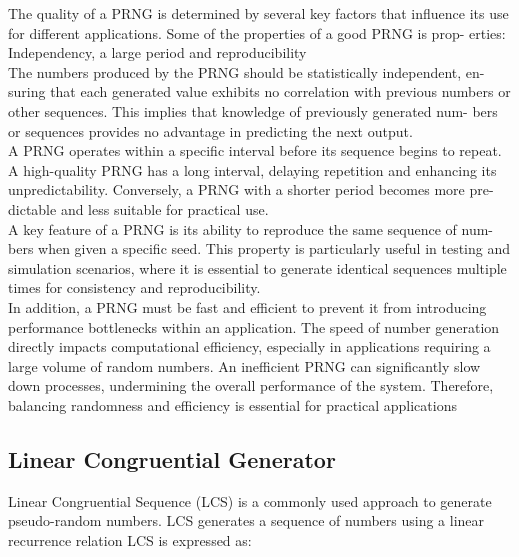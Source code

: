 The quality of a PRNG is determined by several key factors that influence its
use for different applications. Some of the properties of a good PRNG is prop-
erties: Independency, a large period and reproducibility
\newline \\
The numbers produced by the PRNG should be statistically independent, en-
suring that each generated value exhibits no correlation with previous numbers
or other sequences. This implies that knowledge of previously generated num-
bers or sequences provides no advantage in predicting the next output.
\newline \\
A PRNG operates within a specific interval before its sequence begins to repeat.
A high-quality PRNG has a long interval, delaying repetition and enhancing its
unpredictability. Conversely, a PRNG with a shorter period becomes more pre-
dictable and less suitable for practical use.
\newline \\
A key feature of a PRNG is its ability to reproduce the same sequence of num-
bers when given a specific seed. This property is particularly useful in testing
and simulation scenarios, where it is essential to generate identical sequences
multiple times for consistency and reproducibility.
\newline \\
In addition, a PRNG must be fast and efficient to prevent it from introducing
performance bottlenecks within an application. The speed of number generation
directly impacts computational efficiency, especially in applications requiring a
large volume of random numbers. An inefficient PRNG can significantly slow
down processes, undermining the overall performance of the system. Therefore,
balancing randomness and efficiency is essential for practical applications
	
	\subsection{Linear Congruential Generator}
	
	Linear Congruential Sequence (LCS) is a commonly used approach to generate
	pseudo-random numbers. LCS generates a sequence of numbers using a linear
	recurrence relation LCS is expressed as:

